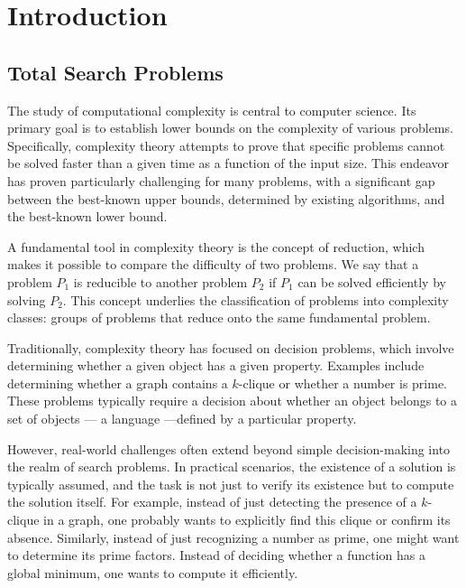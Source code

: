 \setchapterpreamble[u]{\margintoc}
\chapter{Introduction}

\section{Total Search Problems}

The study of computational complexity is central to computer science. Its primary goal is to establish lower bounds on the complexity of various problems. Specifically, complexity theory attempts to prove that specific problems cannot be solved faster than a given time as a function of the input size. This endeavor has proven particularly challenging for many problems, with a significant gap between the best-known upper bounds, determined by existing algorithms, and the best-known lower bound.

A fundamental tool in complexity theory is the concept of reduction, which makes it possible to compare the difficulty of two problems. We say that a problem $P_1$ is reducible to another problem $P_2$ if $P_1$ can be solved efficiently by solving $P_2$. This concept underlies the classification of problems into complexity classes: groups of problems that reduce onto the same fundamental problem.

Traditionally, complexity theory has focused on decision problems, which involve determining whether a given object has a given property. Examples include determining whether a graph contains a $k$-clique or whether a number is prime. These problems typically require a decision about whether an object belongs to a set of objects --- a language ---defined by a particular property.

However, real-world challenges often extend beyond simple decision-making into the realm of search problems. In practical scenarios, the existence of a solution is typically assumed, and the task is not just to verify its existence but to compute the solution itself. For example, instead of just detecting the presence of a $k$-clique in a graph, one probably wants to explicitly find this clique or confirm its absence. Similarly, instead of just recognizing a number as prime, one might want to determine its prime factors. Instead of deciding whether a function has a global minimum, one wants to compute it efficiently.

